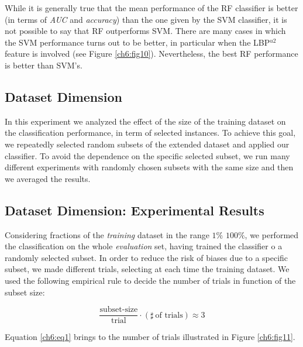While it is generally true that the mean performance of the \Gls{RF} classifier is better (in terms of \textit{AUC} and \textit{accuracy}) than the one given by the
\Gls{SVM} classifier, it is not possible to say that \Gls{RF} outperforms \Gls{SVM}. There are many cases in which the \Gls{SVM} performance turns out to be
better, in particular when the LBP$^{u2}$ feature is involved (see Figure \ref{ch6:fig10}). Nevertheless, the best \Gls{RF} performance is better than \Gls{SVM}'s.


\vspace{0.5cm}

\subsection{Dataset Dimension}

In this experiment we analyzed the effect of the size of the training dataset on the classification performance, in term of selected instances.
To achieve this goal, we repeatedly selected random subsets of the
extended dataset and applied our classifier. To avoid the dependence on the specific selected subset, we run many different experiments with randomly chosen subsets with the same 
size and then we averaged the results.


\vspace{0.5cm}



\subsection{Dataset Dimension: Experimental Results}

Considering fractions of the \textit{training} dataset in the range $1\%$ \textrightarrow $100\%$, we performed the classification on the
whole \textit{evaluation} set, having trained the classifier o a randomly selected subset. In order to reduce the risk of biases due to
a specific subset, we made different trials, selecting at each time the training dataset. We used the following empirical rule to decide 
the number of trials in function of the subset size:

\begin{equation}
\label{ch6:eq1}
 \frac{\textrm{subset-size}}{\textrm{trial}} \cdot \left( \sharp \ \textrm{of trials} \right) \approx 3
\end{equation}

Equation \ref{ch6:eq1} brings to the number of trials illustrated in Figure \ref{ch6:fig11}.

